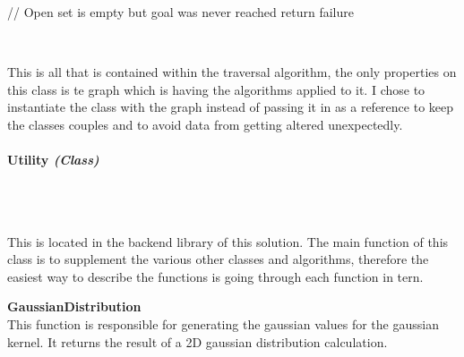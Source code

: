 \begin{FlushLeft}
\begin{pseudocode}
    // Open set is empty but goal was never reached
    return failure
    \end{pseudocode} \\ \BK

    This is all that is contained within the traversal algorithm, the only properties on this class is te graph which is having the algorithms applied to it. I chose to instantiate the class with the graph instead of passing it in as a reference to keep the classes couples and to avoid data from getting altered unexpectedly.
    \bk

    \pagebreak
\paragraph{Utility \textit{(Class)}} \mbox{} \\

    \begin{figure}[H]
        \centering
    \end{figure}\\

    This is located in the backend library of this solution. The main function of this class is to supplement the various other classes and algorithms, therefore the easiest way to describe the functions is going through each function in tern. \\ \bk

    \textbf{GaussianDistribution} \\ \bk
    This function is responsible for generating the gaussian values for the gaussian kernel. It returns the result of a 2D gaussian distribution calculation.\\\bk



\end{FlushLeft}
